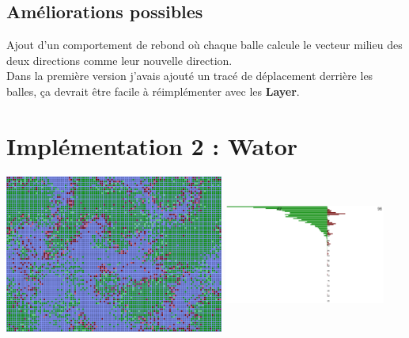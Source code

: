 \documentclass[11pt,a4paper,oneside]{report}
\begin{document}
\subsection*{Améliorations possibles}
Ajout d'un comportement de rebond où chaque balle calcule le vecteur milieu des deux directions comme leur nouvelle direction.\\
Dans la première version j'avais ajouté un tracé de déplacement derrière les balles, ça devrait être facile à réimplémenter avec les \textbf{Layer}.


\newpage

\section*{Implémentation 2 : Wator}

\begin{center}
\includegraphics[width=272px]{wator}
\includegraphics[width=200px, height=195px]{watorpyramid}
\end{center}

\end{document}
